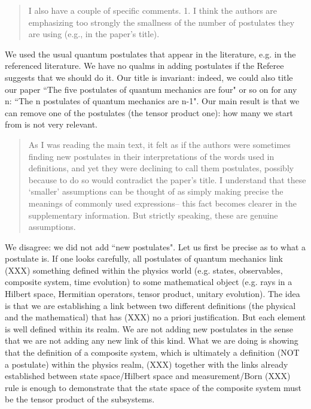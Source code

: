 \documentclass[11pt]{article}
\begin{document}
\begin{quote}
I also have a couple of specific comments. 1. I think the
authors are emphasizing too strongly the smallness of the number of
postulates they are using (e.g., in the paper's title).
\end{quote}

We used the usual quantum postulates that appear in the literature,
e.g. in the referenced literature. We have no qualms in adding
postulates if the Referee suggests that we should do it. Our title is
invariant: indeed, we could also title our paper ``The five postulates
of quantum mechanics are four" or so on for any n: ``The n postulates
of quantum mechanics are n-1". Our main result is that we can remove
one of the postulates (the tensor product one): how many we start from
is not very relevant.

\begin{quote} As I was
reading the main text, it felt as if the authors were sometimes
finding new postulates in their interpretations of the words used in
definitions, and yet they were declining to call them postulates,
possibly because to do so would contradict the paper's title. I
understand that these `smaller' assumptions can be thought of as
simply making precise the meanings of commonly used expressions-- this
fact becomes clearer in the supplementary information. But strictly speaking, these are genuine assumptions.\end{quote}

We disagree: we did not add ``new postulates". 
Let us first be precise as to what a postulate is.
If one looks carefully, all postulates of quantum mechanics link (XXX) something
defined within the physics world (e.g. states, observables, composite system,
time evolution) to some mathematical object (e.g. rays in a Hilbert space, Hermitian
operators, tensor product, unitary evolution). The idea is that we are
establishing a link between two different definitions (the physical
and the mathematical) that has (XXX) no a priori justification. But each
element is well defined within its realm. We are not adding new postulates in the sense that we are not adding any
new link of this kind. What we are doing is showing that the definition of 
a composite system, which is ultimately a definition (NOT a postulate) within the physics
realm, (XXX) together with the links already established between state space/Hilbert
space and measurement/Born (XXX) rule is enough to demonstrate that the state space of the composite
system must be the tensor product of the subsystems.
\end{document}
